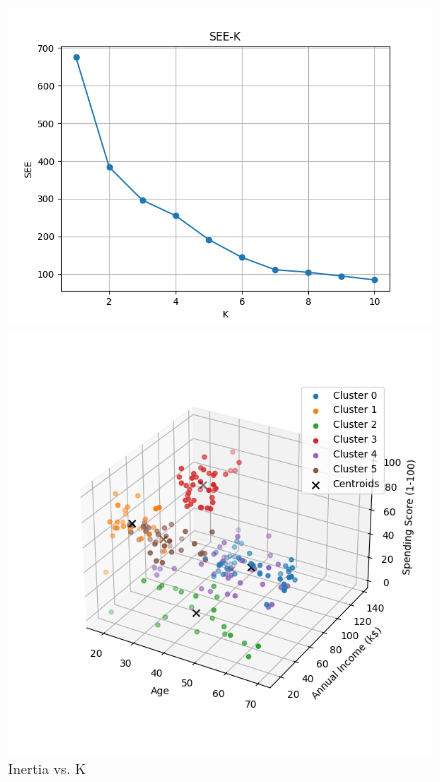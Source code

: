 \documentclass[8pt]{article}
\begin{document}
\begin{figure}[H]
    \centering
    \begin{minipage}{0.32\textwidth}
        \centering
        \includegraphics[width=\textwidth]{./Prob4/out/task3_1_com/SEE-K.png}
        \caption{Inertia vs. K}
        \label{fig: Inertia vs. K com}
    \end{minipage}
    \hfill
    \begin{minipage}{0.32\textwidth}
        \centering
        \includegraphics[width=\textwidth]{./Prob4/out/task3_1_com/images/cluster_result_k6_3d.png}

\end{minipage}
\end{figure}
\end{document}
